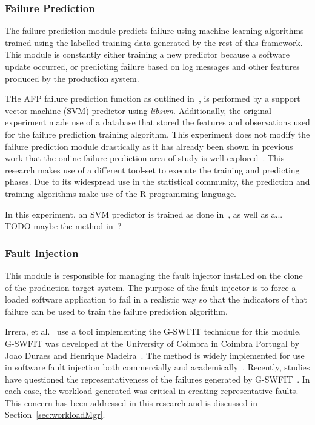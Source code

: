 \subsubsection{Failure Prediction} \label{sec:failurePrediction} %
The failure prediction module predicts failure using machine learning
algorithms trained using the labelled training data generated by the rest of
this framework.  This module is constantly either training a new predictor
because a software update occurred, or predicting failure based on log messages
and other features produced by the production system.

THe AFP failure prediction function as outlined in~\cite{irrera2015}, is
performed by a support vector machine (SVM) predictor using \emph{libsvm}.
Additionally, the original experiment made use of a database that stored the
features and observations used for the failure prediction training algorithm.
This experiment does not modify the failure prediction module drastically as it
has already been shown in previous work that the online failure prediction area
of study is well explored~\cite{salfnerSurvey}.  This research makes use of a
different tool-set to execute the training and predicting phases.  Due to its
widespread use in the statistical community, the prediction and training
algorithms make use of the R programming language.

In this experiment, an SVM predictor is trained as done in~\cite{irrera2015},
as well as a... TODO maybe the method in~\cite{watanabe2014}?

\subsubsection{Fault Injection} \label{sec:faultInjectionMgr}
This module is responsible for managing the fault injector installed on the
clone of the production target system.  The purpose of the fault injector is to
force a loaded software application to fail in a realistic way so that the
indicators of that failure can be used to train the failure prediction
algorithm.

Irrera, et al.~\cite{irrera2015} use a tool implementing the G-SWFIT technique
for this module.  G-SWFIT was developed at the University of Coimbra in Coimbra
Portugal by Joao Duraes and Henrique Madeira~\cite{gswfit}.  The method is
widely implemented for use in software fault injection both commercially and
academically~\cite{natella2010,irrera2014,cotroneo2012,umadevi2015}.  Recently,
studies have questioned the representativeness of the failures generated by
G-SWFIT~\cite{kikuchi2014}.  In each case, the workload generated was critical
in creating representative faults.  This concern has been addressed in this
research and is discussed in Section~\ref{sec:workloadMgr}.

